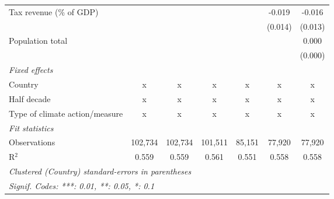 \begin{tabular}{lcccccc}
   Tax revenue (\% of GDP)                &         &               &              &              & -0.019       & -0.016\\   
                                          &         &               &              &              & (0.014)      & (0.013)\\   
   Population total                       &         &               &              &              &              & 0.000\\   
                                          &         &               &              &              &              & (0.000)\\   
   \emph{Fixed effects}\\
   Country                                & x       & x             & x            & x            & x            & x\\  
   Half decade                            & x       & x             & x            & x            & x            & x\\  
   Type of climate action/measure         & x       & x             & x            & x            & x            & x\\  
   \midrule \emph{Fit statistics}\\
   Observations                           & 102,734 & 102,734       & 101,511      & 85,151       & 77,920       & 77,920\\  
   R$^2$                                  & 0.559   & 0.559         & 0.561        & 0.551        & 0.558        & 0.558\\  
   \midrule
   \multicolumn{7}{l}{\emph{Clustered (Country) standard-errors in parentheses}}\\
   \multicolumn{7}{l}{\emph{Signif. Codes: ***: 0.01, **: 0.05, *: 0.1}}\\
\end{tabular}
\par\endgroup


